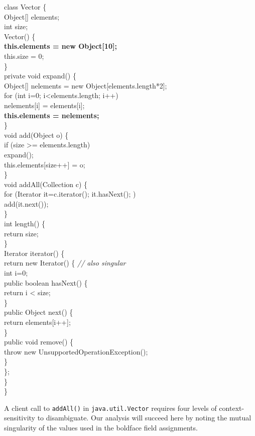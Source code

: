 \documentclass[11pt,notitlepage]{article}
\begin{document}
\begin{myfigure}\small
\begin{samplecode}
class Vector \{\\
\>Object[] elements;\\
\>int size;\\
\>Vector() \{\\
\>\>\textbf{this.elements = new Object[10];}\\
\>\>this.size = 0;\\
\>\}\\
\>private void expand() \{\\
\>\>Object[] nelements = new Object[elements.length*2];\\
\>\>for (int i=0; i<elements.length; i++)\\
\>\>\>nelements[i] = elements[i];\\
\>\>\textbf{this.elements = nelements;}\\
\>\}\\
\>void add(Object o) \{\\
\>\>if (size >= elements.length)\\
\>\>\>expand();\\
\>\>this.elements[size++] = o;\\
\>\}\\
\>void addAll(Collection c) \{\\
\>\>for (Iterator it=c.iterator(); it.hasNext(); )\\
\>\>\>add(it.next());\\
\>\}\\
\>int length() \{\\
\>\>return size;\\
\>\}\\
\>Iterator iterator() \{\\
\>\>return new Iterator() \{ \textit{// also singular}\\
\>\>\>int i=0;\\
\>\>\>public boolean hasNext() \{\\
\>\>\>\>return i < size;\\
\>\>\>\}\\
\>\>\>public Object next() \{\\
\>\>\>\>return elements[i++];\\
\>\>\>\}\\
\>\>\>public void remove() \{\\
\>\>\>\>throw new UnsupportedOperationException();\\
\>\>\>\}\\
\>\>\};\\
\>\}\\
\}\\
\end{samplecode}
\caption{A client call to \texttt{addAll()} in \texttt{java.util.Vector}
  requires four levels of context-sensitivity to disambiguate.  Our
  analysis will succeed here by noting the mutual singularity of the
  values used in the boldface field assignments.}
\label{fig:vector}
\end{myfigure}
\end{document}

